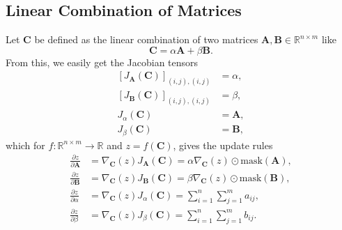 \documentclass{article}
\newcommand{\mat}[1]{\bm{{#1}}}
\newcommand{\mask}[1]{\text{mask}\left( {#1} \right)}
\newcommand{\gradfn}[2]{\nabla_{{#1}}\left({#2}\right)} %
\newcommand{\jac}[2]{J_{{#1}}\left({#2}\right)} %
\newcommand{\elemwise}[2]{\left[#1\right]_{{#2}}} %
\theoremstyle{definition}
\begin{document}
\subsection{Linear Combination of Matrices}
Let $\mat{C}$ be defined as the linear combination of two matrices $\mat{A}, \mat{B} \in \mathbb{R}^{n \times m}$ like
\begin{equation}
  \mat{C} = \alpha\mat{A} + \beta\mat{B}.
\end{equation}
From this, we easily get the Jacobian tensors
\begin{align}
  \elemwise{\jac{\mat{A}}{\mat{C}}}{(i,j),(i,j)} &= \alpha, \\
  \elemwise{\jac{\mat{B}}{\mat{C}}}{(i,j),(i,j)} &= \beta, \\
  \jac{\alpha}{\mat{C}} &= \mat{A}, \\
  \jac{\beta}{\mat{C}} &= \mat{B},
\end{align}
which for $f : \mathbb{R}^{n \times m} \to \mathbb{R}$ and $z=f\left(\mat{C}\right)$, gives the update rules
\begin{align}
  \frac{\partial z}{\partial \mat{A}} &= \gradfn{\mat{C}}{z} \jac{\mat{A}}{\mat{C}} = \alpha \gradfn{\mat{C}}{z} \odot \mask{\mat{A}}, \\
  \frac{\partial z}{\partial \mat{B}} &= \gradfn{\mat{C}}{z} \jac{\mat{B}}{\mat{C}} = \beta \gradfn{\mat{C}}{z} \odot \mask{\mat{B}}, \\
  \frac{\partial z}{\partial \alpha} &= \gradfn{\mat{C}}{z} \jac{\alpha}{\mat{C}} = \sum_{i=1}^n \sum_{j=1}^m a_{ij}, \\
  \frac{\partial z}{\partial \beta} &= \gradfn{\mat{C}}{z} \jac{\beta}{\mat{C}} = \sum_{i=1}^n \sum_{j=1}^m b_{ij}.
\end{align}


\end{document}
